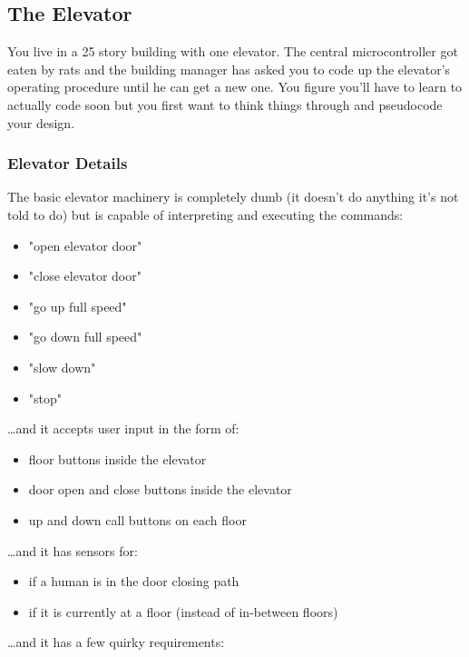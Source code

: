 \documentclass[11pt]{article}
\begin{document}
\subsection{The Elevator}
\label{sec-12-1}

You live in a 25 story building with one elevator. The central 
microcontroller got eaten by rats and the building manager has asked you to 
code up the elevator's operating procedure until he can get a new one. You 
figure you'll have to learn to actually code soon but you first want to think
things through and pseudocode your design.

\subsubsection{Elevator Details}
\label{sec-12-1-1}

The basic elevator machinery is completely dumb (it doesn't do anything it's
not told to do) but is capable of interpreting and executing the commands:

\begin{itemize}
\item "open elevator door"
\item "close elevator door"
\item "go up full speed"
\item "go down full speed"
\item "slow down"
\item "stop"
\end{itemize}


\ldots{}and it accepts user input in the form of:

\begin{itemize}
\item floor buttons inside the elevator
\item door open and close buttons inside the elevator
\item up and down call buttons on each floor
\end{itemize}


\ldots{}and it has sensors for:

\begin{itemize}
\item if a human is in the door closing path
\item if it is currently at a floor (instead of in-between floors)
\end{itemize}


\ldots{}and it has a few quirky requirements:
\end{document}
